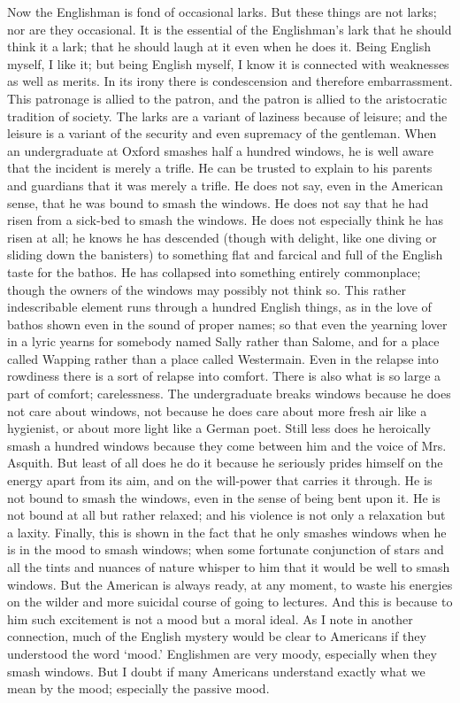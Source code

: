 \documentclass{book}
\begin{document}
Now the Englishman is fond of occasional larks. But these things are not larks; nor are they occasional. It is the essential of the Englishman’s lark that he should think it a lark; that he should laugh at it even when he does it. Being English myself, I like it; but being English myself, I know it is connected with weaknesses as well as merits. In its irony there is condescension and therefore embarrassment. This patronage is allied to the patron, and the patron is allied to the aristocratic tradition of society. The larks are a variant of laziness because of leisure; and the leisure is a variant of the security and even supremacy of the gentleman. When an undergraduate at Oxford smashes half a hundred windows, he is well aware that the incident is merely a trifle. He can be trusted to explain to his parents and guardians that it was merely a trifle. He does not say, even in the American sense, that he was bound to smash the windows. He does not say that he had risen from a sick-bed to smash the windows. He does not especially think he has risen at all; he knows he has descended (though with delight, like one diving or sliding down the banisters) to something flat and farcical and full of the English taste for the bathos. He has collapsed into something entirely commonplace; though the owners of the windows may possibly not think so. This rather indescribable element runs through a hundred English things, as in the love of bathos shown even in the sound of proper names; so that even the yearning lover in a lyric yearns for somebody named Sally rather than Salome, and for a place called Wapping rather than a place called Westermain. Even in the relapse into rowdiness there is a sort of relapse into comfort. There is also what is so large a part of comfort; carelessness. The undergraduate breaks windows because he does not care about windows, not because he does care about more fresh air like a hygienist, or about more light like a German poet. Still less does he heroically smash a hundred windows because they come between him and the voice of Mrs. Asquith. But least of all does he do it because he seriously prides himself on the energy apart from its aim, and on the will-power that carries it through. He is not bound to smash the windows, even in the sense of being bent upon it. He is not bound at all but rather relaxed; and his violence is not only a relaxation but a laxity. Finally, this is shown in the fact that he only smashes windows when he is in the mood to smash windows; when some fortunate conjunction of stars and all the tints and nuances of nature whisper to him that it would be well to smash windows. But the American is always ready, at any moment, to waste his energies on the wilder and more suicidal course of going to lectures. And this is because to him such excitement is not a mood but a moral ideal. As I note in another connection, much of the English mystery would be clear to Americans if they understood the word ‘mood.’ Englishmen are very moody, especially when they smash windows. But I doubt if many Americans understand exactly what we mean by the mood; especially the passive mood.
\end{document}
